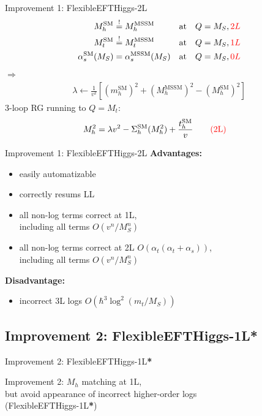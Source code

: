 \documentclass[hyperref={pdfpagelabels=false},ngerman]{beamer}
\newcommand{\cmark}{\ding{51}}%
\newcommand{\xmark}{\ding{55}}%
\newcommand{\ok}{\textcolor{darkgreen}{\cmark}}
\newcommand{\notok}{\textcolor{red}{\xmark}}
\renewcommand{\emph}{\textbf}
\newcommand{\SM}{\ensuremath{\text{SM}}}
\newcommand{\MSSM}{\ensuremath{\text{MSSM}}}
\newcommand{\fsstar}{\textbf{*}}
\begin{document}
\begin{frame}{Improvement 1: FlexibleEFTHiggs-2L}
  \begin{align*}
    M_h^{\SM} &\overset{!}{=} M_h^\text{MSSM} & &\text{at} & Q = M_S, \textcolor{red}{2L} \\
    M_t^{\SM} &\overset{!}{=} M_t^\text{MSSM} & &\text{at} & Q = M_S, \textcolor{red}{1L} \\
    \alpha_s^\SM(M_S) &= \alpha_s^\MSSM(M_S)  & &\text{at} & Q = M_S, \textcolor{red}{0L}
  \end{align*}
  $\Rightarrow$
  \begin{align*}
    \lambda \leftarrow \frac{1}{v^2} \left[
      (m_h^\SM)^2 + (M_h^\text{MSSM})^2 - (M_h^\SM)^2
    \right]
  \end{align*}
  3-loop RG running to $Q = M_t$:
  \begin{align*}
    M_h^2 &= \lambda v^2 - \Sigma^{\SM}_h(M_h^2) + \frac{t_h^\SM}{v}
    \qquad \text{\textcolor{red}{(2L)}}
  \end{align*}
\end{frame}

\begin{frame}{Improvement 1: FlexibleEFTHiggs-2L}
  \emph{Advantages:}
  \begin{itemize}
  \item[\ok] easily automatizable
  \item[\ok] correctly resums LL
  \item[\ok] all non-log terms correct at 1L, \\
    including all terms $O(v^n/M_S^n)$
  \item[\ok] all non-log terms correct at 2L
    $O(\alpha_t(\alpha_t + \alpha_s))$, \\
    including all terms $O(v^n/M_S^n)$
  \end{itemize}
  \emph{Disadvantage:}
  \begin{itemize}
  \item[\notok] incorrect 3L logs $O(\hbar^3 \log^2(m_t/M_S))$
  \end{itemize}
\end{frame}


\subsection{Improvement 2: FlexibleEFTHiggs-1L\protect\fsstar}

\begin{frame}{Improvement 2: FlexibleEFTHiggs-1L\fsstar}
  \begin{center}
    \Large Improvement 2: $M_h$ matching at 1L, \\
    but avoid appearance of incorrect higher-order logs \\
    (FlexibleEFTHiggs-1L\fsstar)
  \end{center}
\end{frame}
\end{document}

